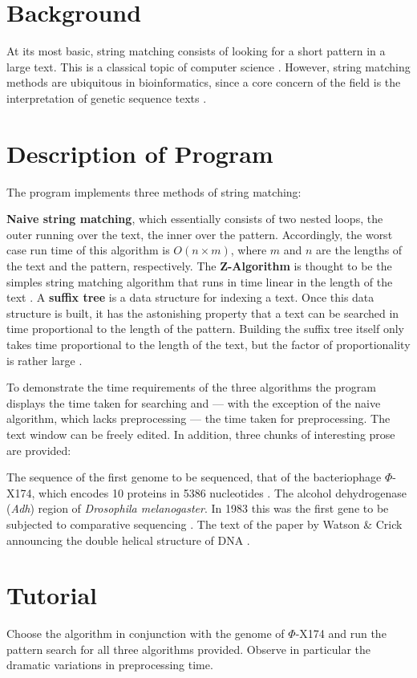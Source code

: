 \section{Background}
At its most basic, string matching consists of looking for a short
pattern in a large text. This is a classical topic of computer science
\cite{gus97:alg}. However, string matching
methods are ubiquitous in bioinformatics, since a core concern of the
field is the interpretation of genetic sequence texts
\cite{gus97:alg}. 

\section{Description of Program}
The program implements three methods of string matching:
\begin{enumerate}
  \I \textbf{Naive string matching}, which essentially consists of two nested
   loops, the outer running over the text, the inner over the
  pattern. Accordingly, the worst case run time of this algorithm is $O(n\times
  m)$, where $m$ and $n$ are the lengths of the text and the pattern,
  respectively. 
  \I The \textbf{Z-Algorithm} is thought to be the simples string
  matching algorithm that runs in time linear in the length of the
  text \cite{gus97:alg}.
  \I A \textbf{suffix tree} is a data structure for indexing a
  text. Once this data structure is built, it has the astonishing
  property that a text can be searched in time
  proportional to the length of the pattern. Building the suffix tree
  itself only 
  takes time proportional to the length 
  of the text, but the factor of
  proportionality is rather large \cite{ukk95:alg,gus97:alg}.
\end{enumerate}
To demonstrate the time requirements of the three algorithms the
program displays the time taken for searching and --- with the exception
of the naive algorithm, which lacks preprocessing --- the time taken for
preprocessing. The text window can be freely edited. In addition,
three chunks of 
interesting prose are provided:
\begin{enumerate}
  \I The sequence of the first genome to be sequenced, that of the
  bacteriophage $\Phi$-X174, which encodes 10
  proteins in 5386 nucleotides \cite{air78:nuc}.
  \I The alcohol dehydrogenase (\textit{Adh}) region of
  \textit{Drosophila melanogaster}. In 1983 this was the first gene to
  be subjected to comparative sequencing \cite{kre83:nuc}. 
  \I The text of the paper by Watson \& Crick announcing the
  double helical structure of DNA \cite{wat53:mol}.
\end{enumerate}

\section{Tutorial}
\begin{itemize}
  \I Choose the  algorithm in conjunction with the genome of
  $\Phi$-X174 and 
  run the pattern search for all three algorithms provided. Observe in
  particular the dramatic variations in preprocessing time.
\end{itemize}






